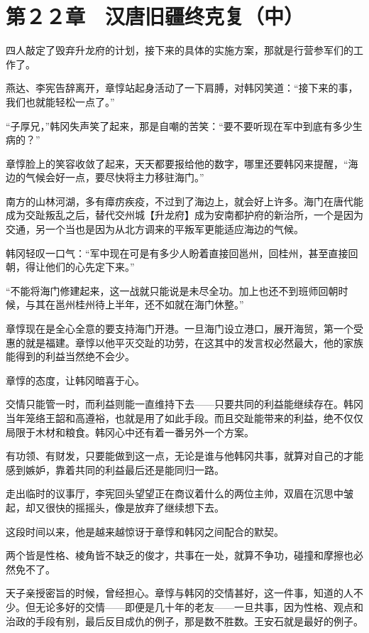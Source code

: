 \section{第２２章　汉唐旧疆终克复（中）}

四人敲定了毁弃升龙府的计划，接下来的具体的实施方案，那就是行营参军们的工作了。

燕达、李宪告辞离开，章惇站起身活动了一下肩膊，对韩冈笑道：“接下来的事，我们也就能轻松一点了。”

“子厚兄，”韩冈失声笑了起来，那是自嘲的苦笑：“要不要听现在军中到底有多少生病的？”

章惇脸上的笑容收敛了起来，天天都要报给他的数字，哪里还要韩冈来提醒，“海边的气候会好一点，要尽快将主力移驻海门。”

南方的山林河湖，多有瘴疠疾疫，不过到了海边上，就会好上许多。海门在唐代能成为交趾叛乱之后，替代交州城【升龙府】成为安南都护府的新治所，一个是因为交通，另一个当也是因为从北方调来的平叛军更能适应海边的气候。

韩冈轻叹一口气：“军中现在可是有多少人盼着直接回邕州，回桂州，甚至直接回朝，得让他们的心先定下来。”

“不能将海门修建起来，这一战就只能说是未尽全功。加上也还不到班师回朝时候，与其在邕州桂州待上半年，还不如就在海门休整。”

章惇现在是全心全意的要支持海门开港。一旦海门设立港口，展开海贸，第一个受惠的就是福建。章惇以他平灭交趾的功劳，在这其中的发言权必然最大，他的家族能得到的利益当然绝不会少。

章惇的态度，让韩冈暗喜于心。

交情只能管一时，而利益则能一直维持下去——只要共同的利益能继续存在。韩冈当年笼络王韶和高遵裕，也就是用了如此手段。而且交趾能带来的利益，绝不仅仅局限于木材和粮食。韩冈心中还有着一番另外一个方案。

有功领、有财发，只要能做到这一点，无论是谁与他韩冈共事，就算对自己的才能感到嫉妒，靠着共同的利益最后还是能同归一路。

走出临时的议事厅，李宪回头望望正在商议着什么的两位主帅，双眉在沉思中皱起，却又很快的摇摇头，像是放弃了继续想下去。

这段时间以来，他是越来越惊讶于章惇和韩冈之间配合的默契。

两个皆是性格、棱角皆不缺乏的俊才，共事在一处，就算不争功，碰撞和摩擦也必然免不了。

天子亲授密旨的时候，曾经担心。章惇与韩冈的交情甚好，这一件事，知道的人不少。但无论多好的交情——即便是几十年的老友——一旦共事，因为性格、观点和治政的手段有别，最后反目成仇的例子，那是数不胜数。王安石就是最好的例子。


